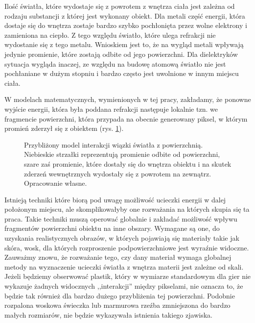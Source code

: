 \documentclass[../main.tex]{subfiles}
\begin{document}
Ilość światła, które wydostaje się z powrotem z wnętrza ciała jest zależna od rodzaju substancji z której jest wykonany obiekt. Dla metali część energii, która dostaje się do wnętrza zostaje bardzo szybko pochłonięta przez wolne elektrony i zamieniona na ciepło. Z tego względu światło, które ulega refrakcji nie wydostanie się z tego metalu. Wnioskiem jest to, że na wygląd metali wpływają jedynie promienie, które zostają odbite od jego powierzchni. Dla dielektryków sytuacja wygląda inaczej, ze względu na budowę atomową światło nie jest pochłaniane w dużym stopniu i bardzo często jest uwolnione w innym miejscu ciała.

W modelach matematycznych, wymienionych w tej pracy, zakładamy, że ponowne wyjście energii, która była poddana refrakcji następuje lokalnie tzn. we fragmencie powierzchni, która przypada na obecnie generowany piksel, w którym promień zderzył się z obiektem (rys. \ref{fig:ReflectionRefraction}).

\begin{figure}[h]
  \centering
  \caption{Przybliżony model interakcji wiązki światła z powierzchnią. Niebieskie strzałki reprezentują promienie odbite od powierzchni, szare zaś promienie, które dostały się do wnętrza obiektu i na skutek zderzeń wewnętrznych wydostały się z powrotem na zewnątrz. Opracowanie własne.}
  \label{fig:ReflectionRefraction}
\end{figure}

Istnieją techniki które biorą pod uwagę możliwość ucieczki energii w dalej położonym miejscu, ale skomplikowałyby one rozważania na których skupia się ta praca. Takie techniki muszą operować globalnie i zakładać możliwość wpływu fragmentów powierzchni obiektu na inne obszary. Wymagane są one, do uzyskania realistycznych obrazów, w których pojawiają się materiały takie jak skóra, wosk, dla których rozproszenie podpowierzchniowe jest wyraźnie widoczne. Zauważmy znowu, że rozważanie tego, czy dany materiał wymaga globalnej metody na wyznaczenie ucieczki światła z wnętrza materii jest zależne od skali. Jeżeli będziemy obserwować plastik, który w wymiarze standardowym dla gier nie wykazuje żadnych widocznych ,,interakcji'' między pikselami, nie oznacza to, że będzie tak również dla bardzo dużego przybliżenia tej powierzchni. Podobnie rozpalona woskowa świeczka lub marmurowa rzeźba zmniejszona do bardzo małych rozmiarów, nie będzie wykazywała istnienia takiego zjawiska.
\end{document}
